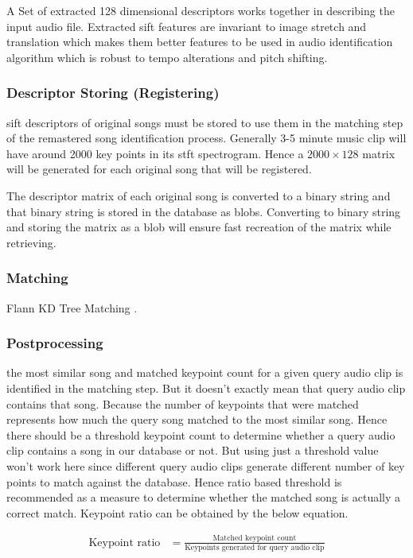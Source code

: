 A Set of extracted 128 dimensional descriptors works together in describing the input audio file. Extracted 
\gls{sift} features are invariant to image stretch and translation which makes them better features to be used
in audio identification algorithm which is robust to tempo alterations and pitch shifting. 

\subsubsection{Descriptor Storing (Registering)}
\gls{sift} descriptors of original songs must be stored to use them in the matching step of the remastered
song identification process. Generally 3-5 minute music clip will have around 2000 key points in its \gls{stft}
spectrogram. Hence a \(2000\times 128\) matrix will be generated for each original song that will be registered.

The descriptor matrix of each original song is converted to a binary string and that binary string is stored 
in the database as \gls{blob}s. Converting to binary string and storing the matrix as a \gls{blob} will ensure
fast recreation of the matrix while retrieving\cite{Sears2006}.   

\subsubsection{Matching}
Flann KD Tree Matching \cite{Muja}.

\subsubsection{Postprocessing}
the most similar song and matched keypoint count for a given query audio clip is identified in the matching step. But
it doesn't exactly mean that query audio clip contains that song. Because the number of keypoints that were matched
represents how much the query song matched to the most similar song. Hence there should be a threshold keypoint count
to determine whether a query audio clip contains a song in our database or not. But using just a threshold value 
won't work here since different query audio clips generate different number of key points to match against the
database. Hence ratio based threshold is recommended as a measure to determine whether the matched song is actually a
correct match. Keypoint ratio can be obtained by the below equation. 

\begin{align*}
\text{Keypoint ratio} &= \frac{\text{Matched keypoint count}}{\text{Keypoints generated for query audio clip}}\\
\end{align*}

